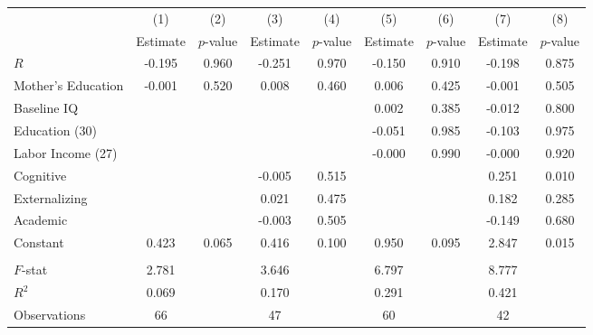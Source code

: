 \begin{tabular}{lcccccccc} \toprule
 & (1) & (2) & (3) & (4) & (5) & (6) & (7) & (8) \\ 
 & Estimate  & $p$-value  & Estimate  & $p$-value  & Estimate  & $p$-value  & Estimate  & $p$-value  \\  \midrule
$R$ &    -0.195 &     0.960 &    -0.251 &     0.970 &    -0.150 &     0.910 &    -0.198 &     0.875 \\  
Mother's Education &    -0.001 &     0.520 &     0.008 &     0.460 &     0.006 &     0.425 &    -0.001 &     0.505 \\  
Baseline IQ &         &         &         &         &     0.002 &     0.385 &    -0.012 &     0.800 \\  
Education (30) &         &         &         &         &    -0.051 &     0.985 &    -0.103 &     0.975 \\  
Labor Income (27) &         &         &         &         &    -0.000 &     0.990 &    -0.000 &     0.920 \\  
Cognitive &         &         &    -0.005 &     0.515 &         &         &     0.251 &     0.010 \\  
Externalizing &         &         &     0.021 &     0.475 &         &         &     0.182 &     0.285 \\  
Academic &         &         &    -0.003 &     0.505 &         &         &    -0.149 &     0.680 \\  
Constant &     0.423 &     0.065 &     0.416 &     0.100 &     0.950 &     0.095 &     2.847 &     0.015 \\  \\ \midrule
$F$-stat &     2.781 &         &     3.646 &         &     6.797 &         &     8.777 &         \\  
$R^2$ &     0.069 &         &     0.170 &         &     0.291 &         &     0.421 &         \\  
Observations &    66 &         &    47 &         &    60 &         &    42 &         \\  
\bottomrule
\end{tabular}

